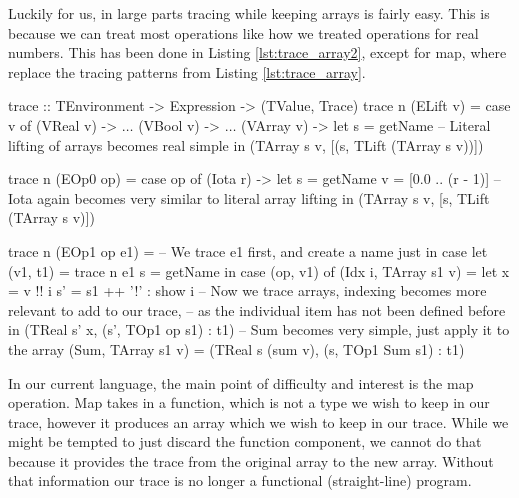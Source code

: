         Luckily for us, in large parts tracing while keeping arrays is fairly easy.
        This is because we can treat most operations like how we treated operations for real numbers.
        This has been done in Listing \ref{lst:trace_array2}, except for map, where replace the tracing patterns from Listing \ref{lst:trace_array}.

        \begin{haskell}[caption=Tracing whilst keeping arrays, label=lst:trace_array2, gobble=12]
            trace :: TEnvironment -> Expression -> (TValue, Trace)
            trace n (ELift v) =
                case v of
                    (VReal  v) -> $\ldots$
                    (VBool  v) -> $\ldots$
                    (VArray v) -> 
                        let s = getName
                        -- Literal lifting of arrays becomes real simple
                        in  (TArray s v, [(s, TLift (TArray s v))])

            trace n (EOp0 op) =
                case op of
                    (Iota r) ->
                        let s = getName
                            v = [0.0 .. (r - 1)]
                            -- Iota again becomes very similar to literal array lifting
                        in  (TArray s v, [s, TLift (TArray s v)])
            
            trace n (EOp1 op e1) =
                -- We trace e1 first, and create a name just in case
                let (v1, t1) = trace n e1
                    s = getName
                in  case (op, v1) of
                    (Idx i, TArray s1 v) =
                        let x  = v !! i
                            s' = s1 ++ '!' : show i
                        -- Now we trace arrays, indexing becomes more relevant to add to our trace,
                        -- as the individual item has not been defined before
                        in  (TReal s' x, (s', TOp1 op s1) : t1)
                    -- Sum becomes very simple, just apply it to the array
                    (Sum, TArray s1 v) = (TReal s (sum v), (s, TOp1 Sum s1) : t1)
        \end{haskell}

        In our current language, the main point of difficulty and interest is the map operation.
        Map takes in a function, which is not a type we wish to keep in our trace, however it produces an array which we wish to keep in our trace.
        While we might be tempted to just discard the function component, we cannot do that because it provides the trace from the original array to the new array.
        Without that information our trace is no longer a functional (straight-line) program.


